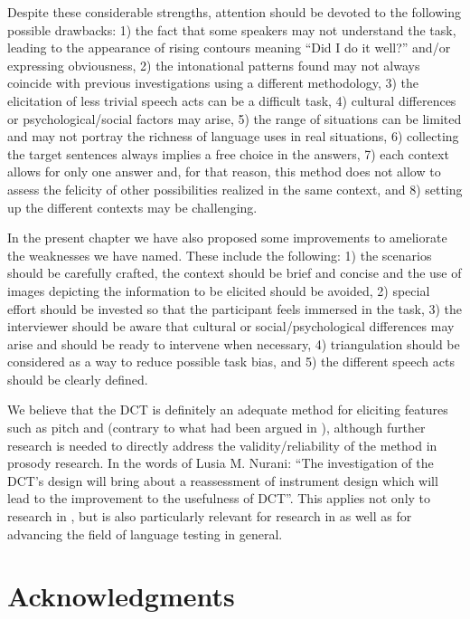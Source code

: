 \documentclass[output=paper]{LSP/langsci}
\begin{document}
Despite these considerable strengths, attention should be devoted to the following possible drawbacks: 1) the fact that some speakers may not understand the task, leading to the appearance of rising contours meaning “Did I do it well?” and/or expressing obviousness, 2) the intonational patterns found may not always coincide with previous investigations using a different methodology, 3) the elicitation of less trivial speech acts can be a difficult task, 4) cultural differences or psychological/social factors may arise, 5) the range of situations can be limited and may not portray the richness of language uses in real situations, 6) collecting the target sentences always implies a free choice in the answers, 7) each context allows for only one answer and, for that reason, this method does not allow to assess the felicity of other possibilities realized in the same context, and 8) setting up the different contexts may be challenging.\pagebreak

In the present chapter we have also proposed some improvements to ameliorate the weaknesses we have named. These include the following: 1) the scenarios should be carefully crafted, the context should be brief and concise and the use of images depicting the information to be elicited should be avoided, 2) special effort should be invested so that the participant feels immersed in the task, 3) the interviewer should be aware that cultural or social/psychological differences may arise and should be ready to intervene when necessary, 4) triangulation should be considered as a way to reduce possible task bias, and 5) the different speech acts should be clearly defined.

We believe that the DCT is definitely an adequate method for eliciting features such as pitch and  (contrary to what had been argued in \citealt{Kasper2000}), although further research is needed to directly address the validity/reliability of the method in prosody research. In the words of Lusia M. Nurani: “The investigation of the DCT’s design will bring about a reassessment of instrument design which will lead to the improvement to the usefulness of DCT”\citep[676]{Nurani2009}. This applies not only to research in , but is also particularly relevant for research in  as well as for advancing the field of language testing in general. 


\section*{Acknowledgments}
\end{document}
